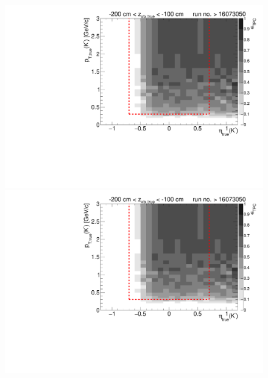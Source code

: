 \begin{figure}[hb]
{		\includegraphics[width=\linewidth,page=16]{graphics/eff/Eff2D_TPC_kaon_Minus_RunRange2.pdf}\\
		\includegraphics[width=\linewidth,page=18]{graphics/eff/Eff2D_TPC_kaon_Minus_RunRange2.pdf}
	}%
\end{figure}


